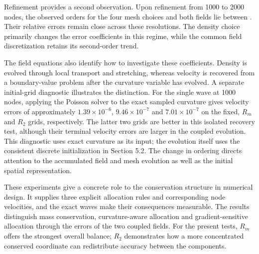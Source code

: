Refinement provides a second observation. Upon refinement from 1000 to 2000 nodes, the observed orders for the four mesh choices and both fields lie between %
. Their relative errors remain close across these resolutions. The density choice primarily changes the error coefficients in this regime, while the common field discretization retains its second-order trend.

The field equations also identify how to investigate these coefficients. Density is evolved through local transport and stretching, whereas velocity is recovered from a boundary-value problem after the curvature variable has evolved. A separate initial-grid diagnostic illustrates the distinction. For the single wave at 1000 nodes, applying the Poisson solver to the exact sampled curvature gives velocity errors of approximately \(1.39\times10^{-6}\), \(9.46\times10^{-7}\) and \(7.01\times10^{-7}\) on the fixed, \(R_m\) and \(R_2\) grids, respectively. The latter two grids are better in this isolated recovery test, although their terminal velocity errors are larger in the coupled evolution. This diagnostic uses exact curvature as its input; the evolution itself uses the consistent discrete initialization in Section 5.2. The change in ordering directs attention to the accumulated field and mesh evolution as well as the initial spatial representation.

These experiments give a concrete role to the conservation structure in numerical design. It supplies three explicit allocation rules and corresponding node velocities, and the exact waves make their consequences measurable. The results distinguish mass conservation, curvature-aware allocation and gradient-sensitive allocation through the errors of the two coupled fields. For the present tests, \(R_m\) offers the strongest overall balance; \(R_2\) demonstrates how a more concentrated conserved coordinate can redistribute accuracy between the components.

